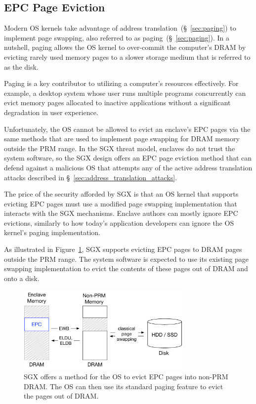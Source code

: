 \subsection{EPC Page Eviction}
\label{sec:sgx_epc_eviction}

Modern OS kernels take advantage of address translation~(\S~\ref{sec:paging})
to implement page swapping, also referred to as paging~(\S~\ref{sec:paging}).
In a nutshell, paging allows the OS kernel to over-commit the computer's DRAM
by evicting rarely used memory pages to a slower storage medium that is
referred to as the disk.

Paging is a key contributor to utilizing a computer's resources effectively.
For example, a desktop system whose user runs multiple programs concurrently
can evict memory pages allocated to inactive applications without a significant
degradation in user experience.

Unfortunately, the OS cannot be allowed to evict an enclave's EPC pages via the
same methods that are used to implement page swapping for DRAM memory outside
the PRM range. In the SGX threat model, enclaves do not trust the system
software, so the SGX design offers an EPC page eviction method that can defend
against a malicious OS that attempts any of the active address translation
attacks described in \S~\ref{sec:address_translation_attacks}.

The price of the security afforded by SGX is that an OS kernel that supports
evicting EPC pages must use a modified page swapping implementation that
interacts with the SGX mechanisms. Enclave authors can mostly ignore EPC
evictions, similarly to how today's application developers can ignore the OS
kernel's paging implementation.

As illustrated in Figure~\ref{fig:sgx_page_eviction}, SGX supports evicting
EPC pages to DRAM pages outside the PRM range. The system software is expected
to use its existing page swapping implementation to evict the contents of these
pages out of DRAM and onto a disk.

\begin{figure}[hbt]
  \centering
  \includegraphics[width=85mm]{figures/sgx_page_eviction.pdf}
  \caption{
    SGX offers a method for the OS to evict EPC pages into non-PRM DRAM. The
    OS can then use its standard paging feature to evict the pages out of DRAM.
  }
  \label{fig:sgx_page_eviction}
\end{figure}

